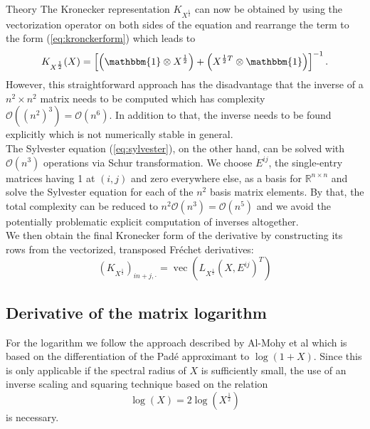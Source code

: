 \begin{chapter}{Theory}
The Kronecker representation $K_{X^{\frac{1}{2}}}$ can now be obtained by using the vectorization operator on both sides of the equation and rearrange the term
to the form (\ref{eq:kronckerform}) which leads to
\begin{equation}
    K_{X^{\frac{1}{2}}}(X)=\left[\left(\mathbbm{1}\otimes X^{\frac{1}{2}}\right)+\left(X^{\frac{1}{2}T}\otimes \mathbbm{1}\right) \right]^{-1}.
\end{equation}
However, this straightforward approach has the disadvantage that the inverse of a $n^2\times n^2$ matrix needs to be computed which has complexity
$\mathcal{O}((n^2)^3)=\mathcal{O}(n^6)$. In addition to that, the inverse needs to be found explicitly which is not numerically stable in general.\\

The Sylvester equation (\ref{eq:sylvester}), on the other hand, can be solved with $\mathcal{O}(n^3)$ operations via Schur transformation. We choose $E^{ij}$, the single-entry
matrices having 1 at $(i,j)$ and zero everywhere else, as a basis for $\mathbb{R}^{n\times n}$ and solve the Sylvester equation for each of the $n^2$ 
basis matrix elements. By that, the total complexity can be reduced to $n^2\mathcal{O}(n^3)=\mathcal{O}(n^5)$ and we avoid the 
potentially problematic explicit computation of inverses altogether.\\

We then obtain the final Kronecker form of the derivative by constructing its rows from the vectorized, transposed Fr\'{e}chet derivatives:
\begin{equation}
    \left(K_{X^{\frac{1}{2}}}\right)_{in + j,\cdot} = \operatorname{vec}\left(L_{X^{\frac{1}{2}}}(X,E^{ij})^T\right) 
\end{equation}

\subsection{Derivative of the matrix logarithm} %
\label{sub:Derivative of the matrix logarithm}
For the logarithm we follow the approach described by Al-Mohy et al \cite{AlmohyFrechet} which is based on the differentiation of the Pad\'{e} approximant to $\log(1+X)$.
Since this is only applicable if the spectral radius of $X$ is sufficiently small, the  use of an inverse scaling and squaring technique based on the relation
\begin{equation}
    \log(X) = 2\log(X^{\frac{1}{2}})
\end{equation}
is necessary.\\


\end{chapter}
